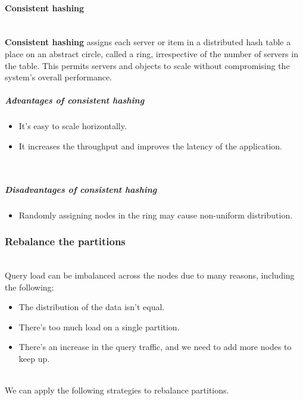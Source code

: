 \paragraph{Consistent hashing}\label{HOpgiWWxcW-lP1h7WMO67}
\\
\textbf{Consistent hashing} assigns each server or item in a distributed hash table a place on an abstract circle, called a ring, irrespective of the number of servers in the table. This permits servers and objects to scale without compromising the system's overall performance.
\\
\subparagraph{Advantages of consistent hashing}\label{DgxSjdx4efS9pv72iHuAO}

\begin{itemize}
\item
\protect{}\label{X697Ur6YY9YzpQIbQxsee}
It's easy to scale horizontally.
\item
\protect{}\label{8zbAlegkRj6Tc78VK-DAz}
It increases the throughput and improves the latency of the application.
\end{itemize}
\\
\subparagraph{Disadvantages of consistent hashing}\label{5cDyZIFX606lseCMfExHS}

\begin{itemize}
\item
\protect{}\label{dhPjD75F-jgJU18_QWsyw}
Randomly assigning nodes in the ring may cause non-uniform distribution.
\end{itemize}

\subsubsection{Rebalance the partitions}\label{dikuw6HtZVr-R6Q7gKKEc}
\\
Query load can be imbalanced across the nodes due to many reasons, including the following:

\begin{itemize}
\item
\protect{}\label{ALKkUvwtvJWYHWU-7ogTM}
The distribution of the data isn't equal.
\item
\protect{}\label{vsE269-dZvtv2poM5MMDJ}
There's too much load on a single partition.
\item
\protect{}\label{KqHQpDq33bI5r09PFcWB_}
There's an increase in the query traffic, and we need to add more nodes to keep up.
\end{itemize}
\\
We can apply the following strategies to rebalance partitions.
\\
